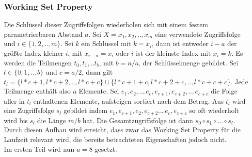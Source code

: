 \documentclass[a4paper,12pt]{article}
\begin{document}
\subsubsection{Working Set Property} \label{testWork}
Die Schlüssel dieser Zugriffsfolgen wiederholen sich mit einem festem parametrierbaren Abstand $a$. 
Sei  $X = x_1, x_2,.., x_m$ eine verwendete Zugriffsfolge und $i \in \{1,2,..,m\}$. Sei $k$ ein Schlüssel mit $k = x_i$, dann ist entweder $i-a$ der größte Index kleiner $i$, mit $x_{i-a} = x_i$ oder $i$ ist der kleinste Index mit $x_i = k$. Es werden die Teilmengen $t_0, t_1,.. t_b$, mit $b = n / a$, der  Schlüsselmenge gebildet. Sei $l \in \{0, 1,.., b\}$ und $c = a/2$, dann gilt \\ $t_l = \{l * c + 1, l * c + 2,.., l * c + c\} \cup \{l * c + 1 + c, l * c + 2 + c,.., l * c + c + c\}$. Jede Teilmenge enthält also $a$ Elemente. Sei $e_1, e_2,.., e_c, e_{c+1}, e_{c+2},.., e_{c+c} $ die Folge aller in $t_l$ enthaltenen Elemente, aufsteigen sortiert nach dem Betrag. Aus $t_l$ wird eine Zugriffsfolge $s_l$ gebildet indem  $e_1, e_{c+1}, e_2,e_{c+2}.., e_c, e_{c + c}$ so oft wiederholt wird bis $s_l$ die Länge $m/b$ hat. Die Gesamtzugriffsfolge ist dann $s_0 \circ s_1 \circ...\circ s_l$. \\
Durch diesen Aufbau wird erreicht, dass zwar das Working Set Property für die Laufzeit relevant wird, die bereits betrachteten Eigenschaften jedoch nicht.\\
Im ersten Teil wird nun $a = 8$ gesetzt.
\end{document}
